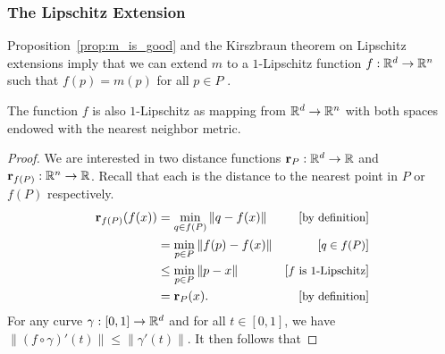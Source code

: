 \subsubsection{The Lipschitz Extension} %
\label{sec:lip_extension}

  Proposition~\ref{prop:m_is_good} and the Kirszbraun theorem on Lipschitz extensions imply that we can extend $m$ to a $1$-Lipschitz function $f: {\mathbb R}^d\to {\mathbb R}^n$ such that $f(p) = m(p)$ for all $p\in P$ \cite{Kirszbraun1934,Valentine1945,brehm1981}.

  \begin{lemma}\label{lem:dist_N_lipschitz}
    The function $f$ is also $1$-Lipschitz as mapping from ${\mathbb R}^d\to {\mathbb R}^n$ with both spaces endowed with the nearest neighbor metric.
  \end{lemma}
  \begin{proof}
    We are interested in two distance functions $\mathbf{r}_P:{\mathbb R}^d \to {\mathbb R}$ and $\mathbf{r}_{f(P)}: {\mathbb R}^n\to {\mathbb R}$.
    Recall that each is the distance to the nearest point in $P$ or $f(P)$ respectively.
    \begin{align*}
      \mathbf{r}_{f(P)}(f(x))
        &= \min_{q\in f(P)} \|q - f(x)\| &\left[\text{\small{by definition}}\right]\\
        &= \min_{p\in P} \|f(p) - f(x)\| &\left[\text{\small{$q\in f(P)$}}\right]\\
        &\le \min_{p\in P} \|p - x\|&\left[\text{\small{$f$ is $1$-Lipschitz}}\right]\\
        &= \mathbf{r}_P(x). &\left[\text{\small{by definition}}\right]\\
    \end{align*}
    For any curve $\gamma:[0,1]\to {\mathbb R}^d$ and for all $t\in [0,1]$, we have $\|(f\circ \gamma)'(t)\| \le \|\gamma'(t)\|$.
    It then follows that


\end{proof}
